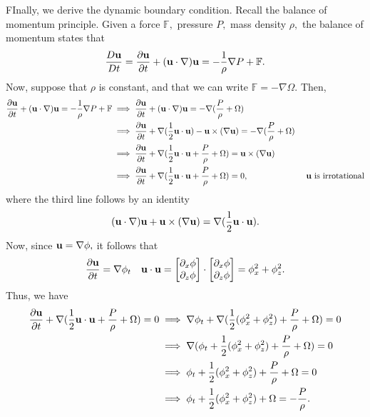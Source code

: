 \documentclass[10pt,reqno,oneside,a4paper]{article}
\begin{document}
FInally, we derive the dynamic boundary condition. Recall the balance of momentum principle. Given a force $\mathbb{F},$ pressure $P,$ mass density $\rho,$ the balance of momentum states that 
\[ 
\frac{D{\bf u}}{Dt} = \frac{\partial {\bf u}}{\partial t} + ({\bf u} \cdot \nabla) {\bf u} = -\frac{1}{\rho}\nabla P + \mathbb{F}.
\]
Now, suppose that $\rho$ is constant, and that we can write $\mathbb{F} = - \nabla \Omega.$ Then, 
\begin{align*}
\frac{\partial {\bf u}}{\partial t} + ({\bf u} \cdot \nabla) {\bf u} = -\frac{1}{\rho}\nabla P + \mathbb{F} &\implies \frac{\partial {\bf u}}{\partial t} + ({\bf u} \cdot \nabla) {\bf u} = - \nabla ( \frac{P}{\rho} + \Omega) \\
&\implies \frac{\partial {\bf u}}{\partial t} + \nabla (\frac{1}{2} {\bf u} \cdot {\bf u}) - {\bf u} \times (\nabla {\bf u}) = - \nabla ( \frac{P}{\rho} + \Omega) \\
&\implies \frac{\partial {\bf u}}{\partial t} + \nabla (\frac{1}{2} {\bf u} \cdot {\bf u} + \frac{P}{\rho} + \Omega) = {\bf u} \times (\nabla {\bf u}) \\
&\implies \frac{\partial {\bf u}}{\partial t} + \nabla (\frac{1}{2} {\bf u} \cdot {\bf u} + \frac{P}{\rho} + \Omega) = 0, &\text{ ${\bf u}$ is irrotational}
\end{align*}
where the third line follows by an identity 
\[
({\bf u} \cdot \nabla) {\bf u} + {\bf u} \times (\nabla {\bf u}) = \nabla (\frac{1}{2} {\bf u} \cdot {\bf u}).
\]
Now, since ${\bf u} = \nabla \phi,$ it follows that 
\[ 
\frac{\partial {\bf u}}{\partial t} = \nabla \phi_t \quad {\bf u} \cdot {\bf u} = \begin{bmatrix} \partial_x \phi \\ \partial_z \phi \end{bmatrix} \cdot \begin{bmatrix} \partial_x \phi \\ \partial_z \phi \end{bmatrix} = \phi_x^2 + \phi_z^2.
\]
Thus, we have 
\begin{align*}
\frac{\partial {\bf u}}{\partial t} + \nabla (\frac{1}{2} {\bf u} \cdot {\bf u} + \frac{P}{\rho} + \Omega) = 0 &\implies \nabla \phi_t  + \nabla (\frac{1}{2} (\phi_x^2 + \phi_z^2) + \frac{P}{\rho} + \Omega) = 0 \\
&\implies \nabla(\phi_t + \frac{1}{2} (\phi_x^2 + \phi_z^2) + \frac{P}{\rho} + \Omega) = 0 \\
&\implies \phi_t + \frac{1}{2} (\phi_x^2 + \phi_z^2) + \frac{P}{\rho} + \Omega = 0 \\
&\implies \phi_t + \frac{1}{2} (\phi_x^2 + \phi_z^2) + \Omega = -  \frac{P}{\rho}.
\end{align*}
\end{document}

